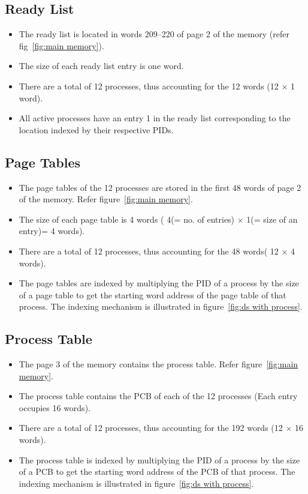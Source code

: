 \documentclass[11pt]{report}
\begin{document}
\subsection{Ready List}
\begin{itemize}
	\item The ready list is located in words 209--220 of page 2 of the memory (refer fig~\ref{fig:main memory}).
	\item The size of each ready list entry is one word.
	\item There are a total of 12 processes, thus accounting for the 12 words (12 $\times$ 1 word).
	\item All active processes have an entry 1 in the ready list corresponding to the location indexed by their respective PIDs.
\end{itemize}

\subsection{Page Tables}
\begin{itemize}
	\item The page tables of the 12 processes are stored in the first 48 words of page 2 of the memory. Refer figure~\ref{fig:main memory}.
	\item The size of each page table is 4 words ( 4(= no. of entries) $\times$ 1(= size of an entry)= 4 words).
	\item There are a total of 12 processes, thus accounting for the 48 words( 12 $\times$ 4 words).
	\item The page tables are indexed by multiplying the PID of a process by the size of a page table to get the starting word address of the page table of that process.  The indexing mechanism is illustrated in figure~\ref{fig:ds with process}.
\end{itemize}

\subsection{Process Table}
\label{lbl:proctbl}
\begin{itemize}
	\item The page 3 of the memory contains the process table. Refer figure~\ref{fig:main memory}.
	\item The process table contains the PCB of each of the 12 processes (Each entry occupies 16 words).
	\item There are a total of 12 processes, thus accounting for the 192 words (12 $\times$ 16 words).
	\item The process table is indexed by multiplying the PID of a process by the size of a PCB to get the starting word address of the PCB of that process. The indexing mechanism is illustrated in figure~\ref{fig:ds with process}.
\end{itemize}
\end{document}
